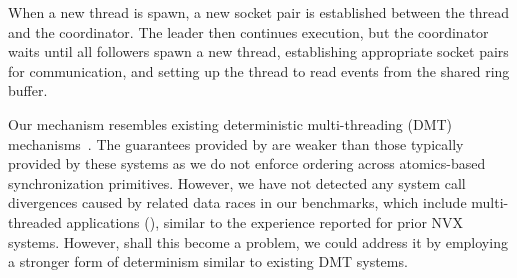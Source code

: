 When a new thread is spawn, a new socket pair is established between the thread
and the coordinator. The leader then continues execution, but the coordinator
waits until all followers spawn a new thread, establishing appropriate socket
pairs for communication, and setting up the thread to read events from the
shared ring buffer.

Our mechanism resembles existing deterministic multi-threading (DMT)
mechanisms~\cite{coredet:asplos10,dthreads:sosp11}. The guarantees
provided by \nx are weaker than those typically provided by these
systems as we do not enforce ordering across atomics-based
synchronization primitives.  
%
%
However, we have not detected any system call divergences caused by
related data races in our benchmarks, which include multi-threaded
applications (\eg \redis), similar to the experience reported for
prior NVX systems.  However, shall this become a problem, we could
address it by employing a stronger form of determinism similar to
existing DMT systems.




